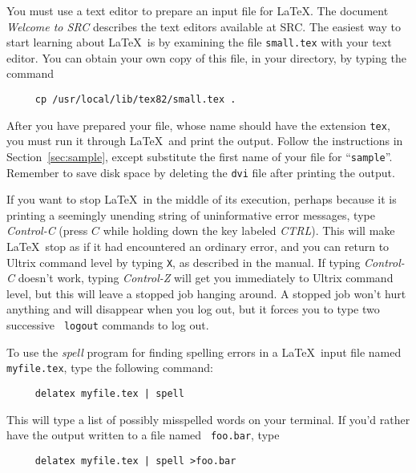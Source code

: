 You must use a text editor to prepare an input file for \LaTeX. The
document {\em Welcome to SRC\/} describes the text editors available
at SRC.  The easiest way to start learning about \LaTeX\ is by 
examining the file \mbox{\tt small.tex} with your text editor.
You can obtain your own copy of this file, in your directory,
by typing the command
\begin{verbatim}
     cp /usr/local/lib/tex82/small.tex .
\end{verbatim}

After you have prepared your file, whose name should have the extension
{\tt tex}, you must run it through \LaTeX\ and print the output.
Follow the instructions in Section~\ref{sec:sample}, except substitute
the first name of your file for ``\mbox{\tt sample}''.  Remember to
save disk space by deleting the {\tt dvi} file after printing the
output.



If you want to stop \LaTeX\ in the middle of its execution, perhaps
because it is printing a seemingly unending string of uninformative
error messages, type {\em Control-C\/} (press $C$ while holding down
the key labeled {\em CTRL\/}).  This will make \LaTeX\ stop as if it
had encountered an ordinary error, and you can return to Ultrix command
level by typing {\tt X}, as described in the manual.  If typing {\em
Control-C\/} doesn't work, typing {\em Control-Z\/} will get you
immediately to Ultrix command level, but this will leave a stopped job
hanging around.  A stopped job won't hurt anything and will disappear
when you log out, but it forces you to type two successive \mbox{\tt
logout} commands to log out.

To use the {\em spell\/} program for finding spelling errors in a
\LaTeX\ input file named \mbox{\tt myfile.tex}, type the following
command:
\begin{verbatim}
     delatex myfile.tex | spell
\end{verbatim}
This will type a list of possibly misspelled words on your terminal.
If you'd rather have the output written to a file named \mbox{\tt
foo.bar}, type
\begin{verbatim}
     delatex myfile.tex | spell >foo.bar
\end{verbatim}


